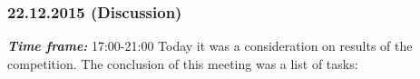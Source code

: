 \subsubsection{22.12.2015 (Discussion)}
\textit{\textbf{Time frame:}} 17:00-21:00 \newline
Today it was a consideration on results of the competition. The conclusion of this meeting was a list of tasks:

